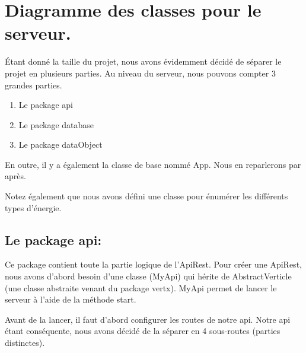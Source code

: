 \section{Diagramme des classes pour le serveur.}

\begin{flushleft}
Étant donné la taille du projet, nous avons évidemment décidé de séparer le projet en plusieurs parties. Au niveau du serveur, nous pouvons compter 3 grandes parties.
\end{flushleft}

\begin{enumerate}[-]
\item Le package api
\item Le package database
\item Le package dataObject
\end{enumerate}

\begin{flushleft}
En outre, il y a également la classe de base nommé App. Nous en reparlerons par après.
\end{flushleft}

\begin{flushleft}
Notez également que nous avons défini une classe pour énumérer les différents types d'énergie.
\end{flushleft}

\subsection{Le package api:}

\begin{flushleft}
Ce package contient toute la partie logique de l'ApiRest. Pour créer une ApiRest, nous avons d'abord besoin d'une classe (MyApi) qui hérite de AbstractVerticle (une classe abstraite venant du package vertx). MyApi permet de lancer le serveur à l'aide de la méthode start.
\end{flushleft}

\begin{flushleft}
Avant de la lancer, il faut d'abord configurer les routes de notre api. Notre api étant conséquente, nous avons décidé de la séparer en 4 sous-routes (parties distinctes).
\end{flushleft}

